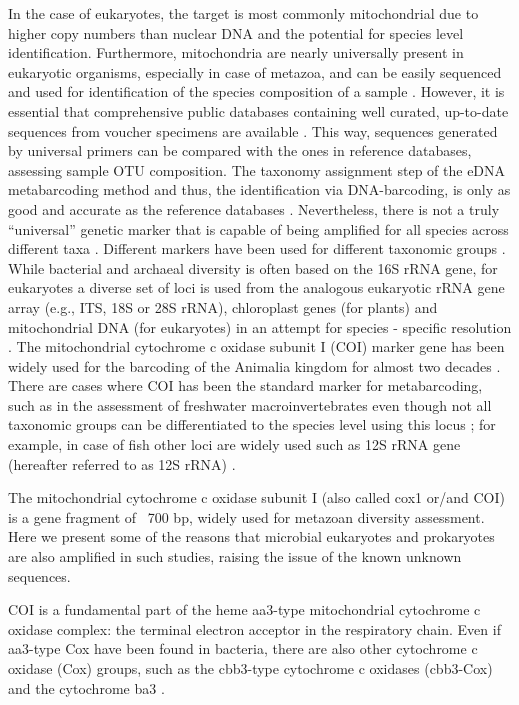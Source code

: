    In the case of eukaryotes, the target is most commonly mitochondrial due to higher copy numbers than nuclear DNA and the potential for species level identification. 
   Furthermore, mitochondria are nearly universally present in eukaryotic organisms, especially in case of metazoa, and can be easily sequenced and used for identification of the species composition of a sample \citep{taberlet2012towards}. 
   However, it is essential that comprehensive public databases containing well curated, up-to-date sequences from voucher specimens are available \citep{schenekar2020reference}. 
   This way, sequences generated by universal primers can be compared with the ones in reference databases, assessing sample OTU composition. 
   The taxonomy assignment step of the eDNA metabarcoding method and thus, the identification via DNA-barcoding, is only as good and accurate as the reference databases \citep{cilleros2019unlocking}. 
   Nevertheless, there is not a truly “universal” genetic marker that is capable of being amplified for all species across different taxa \citep{kress2015dna}. 
   Different markers have been used for different taxonomic groups \citep{deiner2017environmental}. 
   While bacterial and archaeal diversity is often based on the 16S rRNA gene, for eukaryotes a diverse set of loci is used from the analogous eukaryotic rRNA gene array (e.g., ITS, 18S or 28S rRNA), chloroplast genes (for plants) and mitochondrial DNA (for eukaryotes) in an attempt for species - specific resolution \citep{coissac2012bioinformatic}. 
   The mitochondrial cytochrome c oxidase subunit I (COI) marker gene has been widely used for the barcoding of the Animalia kingdom for almost two decades \citep{hebert2003barcoding}.
   There are cases where COI has been the standard marker for metabarcoding, such as in the assessment of freshwater macroinvertebrates \citep{elbrecht2017validation} even though not all taxonomic groups can be differentiated to the species level using this locus \citep{deiner2017environmental}; 
   for example, in case of fish other loci are widely used such as 12S rRNA gene (hereafter referred to as 12S rRNA) \citep{miya2020mifish}.


   The mitochondrial cytochrome c oxidase subunit I (also called cox1 or/and COI) is a gene fragment of ~700 bp, widely used for metazoan diversity assessment. Here we present some of the reasons that microbial eukaryotes and prokaryotes are also amplified in such studies, raising the issue of the known unknown sequences.

   COI is a fundamental part of the heme aa3-type mitochondrial cytochrome c oxidase complex: the terminal electron acceptor in the respiratory chain. 
   Even if aa3-type Cox have been found in bacteria, there are also other cytochrome c oxidase (Cox) groups, such as the cbb3-type cytochrome c oxidases (cbb3-Cox) and the cytochrome ba3 \citep{ekici2012biogenesis, schimo2017cytochrome}.

